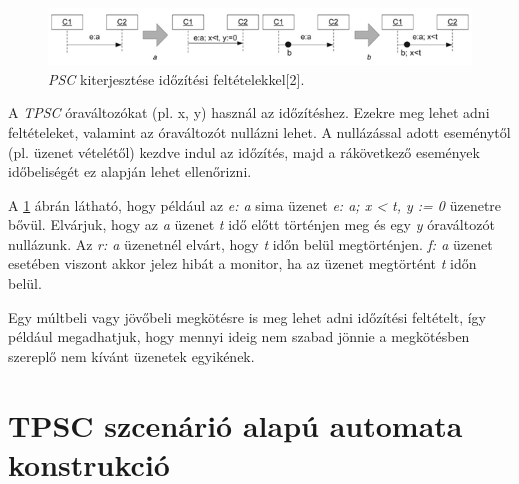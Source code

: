 \begin{figure}[!ht]
    \centering
    \includegraphics[width=150mm, keepaspectratio]{figures/4abra.png}
    \caption{\textit{PSC} kiterjesztése időzítési feltételekkel[2].}
    \label{psc_clock_improvement}
\end{figure}

A \textit{TPSC} óraváltozókat (pl. x, y) használ az időzítéshez.
Ezekre meg lehet adni feltételeket, valamint az óraváltozót nullázni lehet.
A nullázással adott eseménytől (pl. üzenet vételétől) kezdve indul az időzítés, majd a rákövetkező események időbeliségét ez alapján lehet ellenőrizni.

A \ref{psc_clock_improvement} ábrán látható, hogy például az \textit{e: a} sima üzenet \textit{e: a; x < t, y := 0} üzenetre bővül.
Elvárjuk, hogy az \textit{a} üzenet \textit{t} idő előtt történjen meg és egy \textit{y} óraváltozót nullázunk.
Az \textit{r: a} üzenetnél elvárt, hogy \textit{t} időn belül megtörténjen. \textit{f: a} üzenet esetében viszont akkor jelez hibát a monitor, ha az üzenet megtörtént \textit{t} időn belül.

Egy múltbeli vagy jövőbeli megkötésre is meg lehet adni időzítési feltételt, így például megadhatjuk, hogy mennyi ideig nem szabad jönnie a megkötésben szereplő nem kívánt üzenetek egyikének.

\clearpage\section{TPSC szcenárió alapú automata konstrukció}

